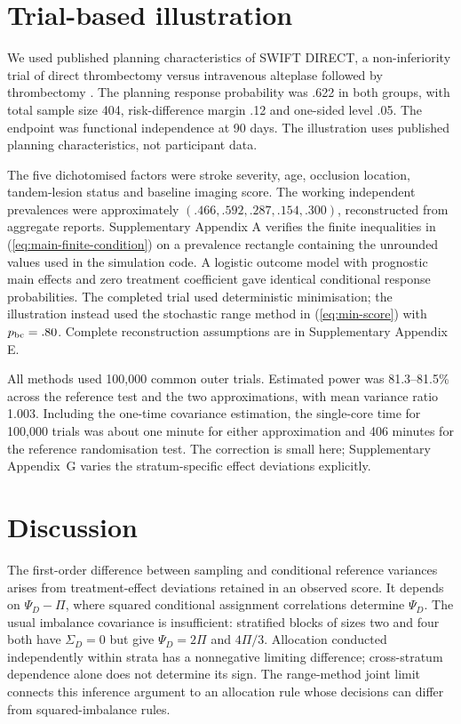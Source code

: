 \documentclass[12pt,a4paper]{article}
\theoremstyle{definition}
\begin{document}

\section{Trial-based illustration}\label{sec:case-study}
We used published planning characteristics of SWIFT DIRECT, a non-inferiority trial of direct thrombectomy versus intravenous alteplase followed by thrombectomy \citep{FischerEtAl2022Protocol,FischerEtAl2022Trial}. The planning response probability was .622 in both groups, with total sample size 404, risk-difference margin .12 and one-sided level .05. The endpoint was functional independence at 90 days. The illustration uses published planning characteristics, not participant data.

The five dichotomised factors were stroke severity, age, occlusion location, tandem-lesion status and baseline imaging score. The working independent prevalences were approximately $(.466,.592,.287,.154,.300)$, reconstructed from aggregate reports. Supplementary Appendix A verifies the finite inequalities in (\ref{eq:main-finite-condition}) on a prevalence rectangle containing the unrounded values used in the simulation code. A logistic outcome model with prognostic main effects and zero treatment coefficient gave identical conditional response probabilities. The completed trial used deterministic minimisation; the illustration instead used the stochastic range method in (\ref{eq:min-score}) with $p_{\rm bc}=.80$. Complete reconstruction assumptions are in Supplementary Appendix E.

All methods used 100,000 common outer trials. Estimated power was 81.3--81.5\% across the reference test and the two approximations, with mean variance ratio 1.003. Including the one-time covariance estimation, the single-core time for 100,000 trials was about one minute for either approximation and 406 minutes for the reference randomisation test. The correction is small here; Supplementary Appendix~G varies the stratum-specific effect deviations explicitly.

\section{Discussion}\label{sec:discussion}
The first-order difference between sampling and conditional reference variances arises from treatment-effect deviations retained in an observed score. It depends on $\Psi_D-\Pi$, where squared conditional assignment correlations determine $\Psi_D$. The usual imbalance covariance is insufficient: stratified blocks of sizes two and four both have $\Sigma_D=0$ but give $\Psi_D=2\Pi$ and $4\Pi/3$. Allocation conducted independently within strata has a nonnegative limiting difference; cross-stratum dependence alone does not determine its sign. The range-method joint limit connects this inference argument to an allocation rule whose decisions can differ from squared-imbalance rules.
\end{document}
